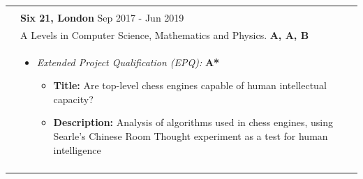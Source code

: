 \documentclass[11pt]{article}
\begin{document}
\begin{minipage}[t][0pt]{\linewidth}
\begin{tabular}[t]{p{2cm} p{14cm}}
	               \\
	               \\ &

	               \textbf{Six 21, London} \hfill Sep 2017 - Jun 2019                                                                                                                                                                                                                                                                                                 \\ &
	               A Levels in Computer Science, Mathematics and Physics. \hfill \textbf{A, A, B}                                                                                                                                                                                                                                                                     \\ &

	               \begin{itemize}
		               \renewcommand{\labelitemi}{$\diamond$}
		               \item \textit{Extended Project Qualification (EPQ):} \hfill \textbf{A*}
		                     \begin{itemize}
			                     \renewcommand{\labelitemii}{$\cdot$}
			                     \item \textbf{Title:} Are top-level chess engines capable of human intellectual capacity?
			                     \item \textbf{Description:} Analysis of algorithms used in chess engines, using Searle's Chinese Room Thought experiment as a test for human intelligence
		                     \end{itemize}
	               \end{itemize}

	               \\                                                                                                                                                          \\


\end{tabular}
\end{minipage}
\end{document}
